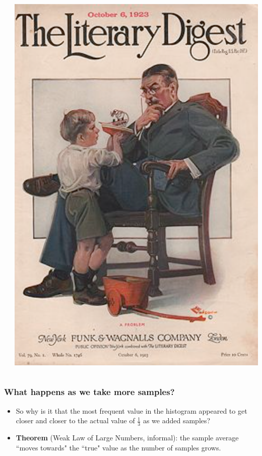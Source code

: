 \documentclass[aspectratio=169]{beamer}
\theoremstyle{principle}
\begin{document}
\begin{frame}
\begin{columns}
\begin{column}{0.5\textwidth}
\end{column}
\begin{column}{0.5\textwidth}
\begin{center}
\includegraphics[scale=0.3]{LD.png}
\end{center}
\end{column}
\end{columns}

\end{frame}

\begin{frame}
\frametitle{What happens as we take more samples?}

\begin{itemize}
\item So why is it that the most frequent value in the histogram appeared to get closer and closer to the actual value of $\frac{1}{3}$ as we added samples?
\bigskip
\bigskip
\bigskip
\item \textbf{Theorem} (Weak Law of Large Numbers, informal): the sample average ``moves towards" the ``true" value as the number of samples grows.

\end{itemize}

\end{frame}
\end{document}
